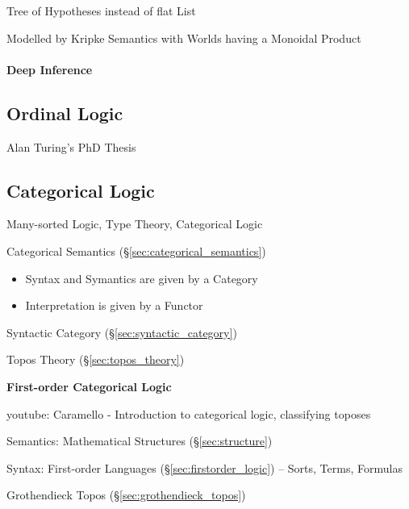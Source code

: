 Tree of Hypotheses instead of flat List

Modelled by Kripke Semantics with Worlds having a Monoidal Product



\paragraph{Deep Inference}\label{sec:deep_inference}\hfill



\subsection{Ordinal Logic}\label{sec:ordinal_logic}

Alan Turing's PhD Thesis \cite{turing38}



\subsection{Categorical Logic}\label{sec:categorical_logic}

Many-sorted Logic, Type Theory, Categorical Logic

Categorical Semantics (\S\ref{sec:categorical_semantics})

\begin{itemize}
  \item Syntax and Symantics are given by a Category
  \item Interpretation is given by a Functor
\end{itemize}

Syntactic Category (\S\ref{sec:syntactic_category})

Topos Theory (\S\ref{sec:topos_theory})


\textbf{First-order Categorical Logic}

youtube: Caramello - Introduction to categorical logic, classifying
toposes

Semantics: Mathematical Structures (\S\ref{sec:structure})

Syntax: First-order Languages (\S\ref{sec:firstorder_logic}) --
Sorts, Terms, Formulas

Grothendieck Topos (\S\ref{sec:grothendieck_topos})

